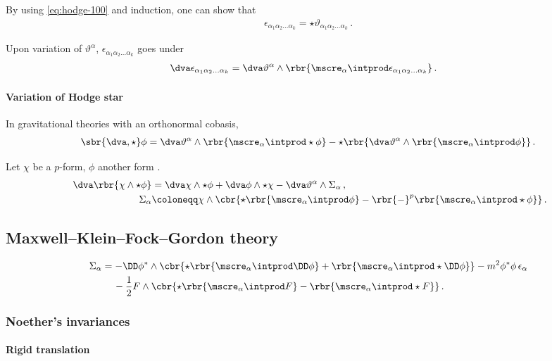 \documentclass[a4paper]{article}
\begin{document}
By using \cref{eq:hodge-100} and induction, one can show that
\begin{align}
\epsilon_{\alpha_{1}\alpha_{2}\ldots \alpha_{k}} =
\star \vartheta_{\alpha_{1}\alpha_{2}\ldots \alpha_{k}}\,.
\end{align}

Upon variation of $\vartheta^{\alpha}$, $\epsilon_{\alpha_{1}\alpha_{2}\ldots 
\alpha_{k}}$ goes under \cite[sec.\ A.2]{Muench1998}
\begin{align}
\dva \epsilon_{\alpha_{1}\alpha_{2}\ldots \alpha_{k}} &=
\dva \vartheta^{\alpha} \wedge \rbr{\mscre_{\alpha}\intprod 
	\epsilon_{\alpha_{1}\alpha_{2}\ldots \alpha_{k}}}\,.
\end{align}

\paragraph{Variation of Hodge star}
In gravitational theories \cite[sec.\ 3.2]{Muench1998} with an orthonormal 
cobasis,
\begin{align}
\sbr{\dva, \star}\phi = 
\dva\vartheta^{\alpha}\wedge\rbr{\mscre_{\alpha}\intprod\star\phi} -
\star\rbr{\dva\vartheta^{\alpha}\wedge\rbr{\mscre_{\alpha}\intprod\phi}}\,.
\end{align}

Let $\chi$ be a $p$-form, $\phi$ another form \cite[sec.\ 5]{Itin1999}.
\begin{align}\
\dva\rbr{\chi\wedge\star\phi} &=
\dva \chi \wedge \star \phi + \dva \phi \wedge \star \chi -
	\dva \vartheta^{\alpha} \wedge \Sigma_{\alpha}\,,
\\
\Sigma_{\alpha} &\coloneqq \chi \wedge \cbr{
	\star\rbr{\mscre_{\alpha}\intprod\phi} -
	\rbr{-}^{p} \rbr{\mscre_{\alpha}\intprod\star\phi}}\,.
\end{align}

\subsection{Maxwell--Klein--Fock--Gordon theory}


\begin{align}
\begin{split}
\Sigma_{\alpha} &=
	-\DD\phi^* \wedge \cbr{\star\rbr{\mscre_{\alpha}\intprod \DD\phi} +
		\rbr{\mscre_{\alpha}\intprod\star\DD\phi}}
-m^2\phi^*\phi\,\epsilon_{\alpha}
\\
&\quad\,
- \frac{1}{2} F \wedge \cbr{\star\rbr{\mscre_{\alpha}\intprod F} -
		\rbr{\mscre_{\alpha}\intprod \star F}}\,.
\end{split}
\end{align}

\subsubsection{Noether's invariances}
\cite{Avery2015}

\paragraph{Rigid translation}

%


\printbibliography
\end{document}
